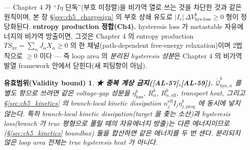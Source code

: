 \documentclass[11pt,a4paper]{article}
\newtheorem*{boundbox}{유효범위(Validity bound)}
\newcommand{\eff}{\mathrm{eff}}
\newcommand{\irr}{\mathrm{irr}}
\newcommand{\prog}{\mathrm{prog}}
\newcommand{\hys}{\mathrm{hys}}
\newcommand{\loss}{\mathrm{loss}}
\newcommand{\AL}[1]{\textsf{[AL-#1]}}
\begin{document}
— Chapter 4 가 ``$I\eta$ 단독''(부호 미정렬)을 비가역 열로 쓰는 것을 차단한 것과 같은 원칙이며, 본 장
\S\ref{sec:ch5_chargesign} 의 부호 상쇄 유도로 $|I_s|\,\Delta V_{\hys\text{-}\loss}^b\ge0$ 형이 정당화된다.
\textbf{entropy production 정합(Ch4).} hysteresis loss 가 metastable 자유에너지의 비가역 방출이면, 그것은
Chapter 4 의 entropy production $T\dot S_\irr=\sum_\alpha J_\alpha X_\alpha\ge0$ 의 한 채널(path-dependent
free-energy relaxation)이며 2법칙으로 $\ge0$ 이다 — 즉 loop area 의 \emph{분리된 hysteresis 성분}은 Chapter 4
의 비가역 발열 framework 안에서 닫힌다(새 피팅항이 아님).
\begin{boundbox}
\textbf{★ 중복 계상 금지(\AL{57},\AL{59}).} $\dot{\mathcal Q}_{\hys,n}^b$ 를 별도 항으로 쓰려면 같은 voltage-gap
성분을 $\eta_\loss^b$, $R_n^b$, $R_{n,\eff}^b$, transport heat, 그리고 \S\ref{sec:ch5_kinetics} 의 branch-local
kinetic dissipation $n_j^{\eff}I_j\eta_{j,\prog}^b$ 에 \emph{동시에} 넣지 않는다. 특히 branch-local kinetic
dissipation(target 을 좇는 소산)과 hysteresis loss(branch 가 true 평형으로 풀릴 때의 자유에너지 방출)는
\emph{다른 에너지}이므로(\S\ref{sec:ch5_kinetics} boundbox) 둘을 합산하면 같은 에너지를 두 번 센다. 분리되지
않은 loop area 전체는 true hysteresis heat 가 아니다.
\end{boundbox}

\end{document}

